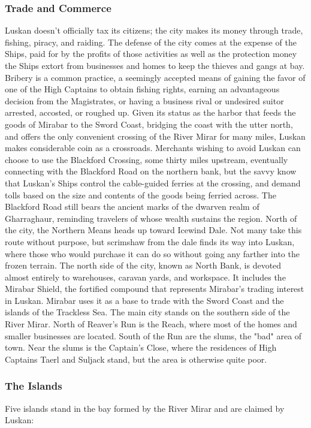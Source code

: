 \documentclass[10pt,a4paper,twoside,twocolumn,openany,bg=print,nodeprecatedcode]{dndbook}
\begin{document}
\subsubsection{Trade and Commerce}
Luskan doesn't officially tax its citizens; the city makes its money through trade, fishing, piracy, and raiding. The defense of the city comes at the expense of the Ships, paid for by the profits of those activities as well as the protection money the Ships extort from businesses and homes to keep the thieves and gangs at bay. Bribery is a common practice, a seemingly accepted means of gaining the favor of one of the High Captains to obtain fishing rights, earning an advantageous decision from the Magistrates, or having a business rival or undesired suitor arrested, accosted, or roughed up.
Given its status as the harbor that feeds the goods of Mirabar to the Sword Coast, bridging the coast with the utter north, and offers the only convenient crossing of the River Mirar for many miles, Luskan makes considerable coin as a crossroads. Merchants wishing to avoid Luskan can choose to use the Blackford Crossing, some thirty miles upstream, eventually connecting with the Blackford Road on the northern bank, but the savvy know that Luskan's Ships control the cable-guided ferries at the crossing, and demand tolls based on the size and contents of the goods being ferried across. The Blackford Road still bears the ancient marks of the dwarven realm of Gharraghaur, reminding travelers of whose wealth sustains the region.
North of the city, the Northern Means heads up toward Icewind Dale. Not many take this route without purpose, but scrimshaw from the dale finds its way into Luskan, where those who would purchase it can do so without going any farther into the frozen terrain.
The north side of the city, known as North Bank, is devoted almost entirely to warehouses, caravan yards, and workspace. It includes the Mirabar Shield, the fortified compound that represents Mirabar's trading interest in Luskan. Mirabar uses it as a base to trade with the Sword Coast and the islands of the Trackless Sea.
The main city stands on the southern side of the River
Mirar. North of Reaver's Run is the Reach, where most of the homes and smaller businesses are located. South of the Run are the slums, the "bad" area of town. Near the slums is the Captain's Close, where the residences of High Captains Taerl and Suljack stand, but the area is otherwise quite poor.
\subsubsection{The Islands}
Five islands stand in the bay formed by the River Mirar and are claimed by Luskan:
\end{document}
